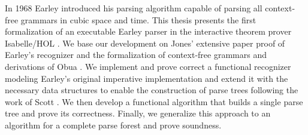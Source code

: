 \documentclass[headsepline,footsepline,footinclude=false,oneside,fontsize=11pt,paper=a4,listof=totoc,bibliography=totoc]{scrbook} %
\begin{document}
In 1968 Earley \cite{Earley:1970} introduced his parsing algorithm capable of parsing all context-free grammars in cubic
space and time. This thesis presents the first formalization of an executable Earley parser in the interactive
theorem prover Isabelle/HOL \cite{Nipkow:2002}. We base our development on Jones' \cite{Jones:1972}
extensive paper proof of Earley's recognizer and the formalization of context-free grammars
and derivations of Obua \cite{Obua:2017} \cite{LocalLexing-AFP}. We implement and prove correct a functional recognizer modeling Earley's
original imperative implementation and extend it with the necessary data structures to enable the construction
of parse trees following the work of Scott \cite{Scott:2008}. We then develop a functional algorithm that
builds a single parse tree and prove its correctness. Finally, we generalize this approach to an algorithm
for a complete parse forest and prove soundness.

\tableofcontents{}

\mainmatter{}




\printbibliography{}
\end{document}
